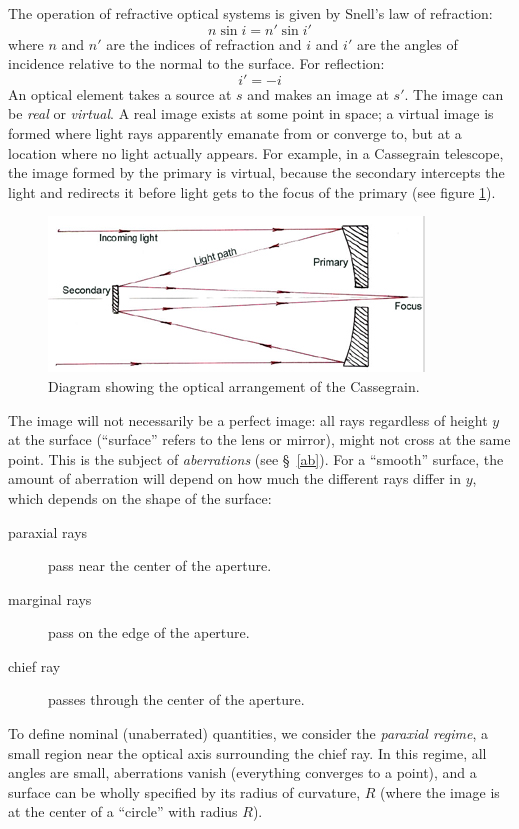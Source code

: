 \documentclass[12pt]{article}
\begin{document}
The operation of refractive optical systems is given by Snell's law
of refraction:
\[
    n\sin{i} = n'\sin{i'}
    \]
where $n$ and $n'$ are the indices of refraction and $i$ and $i'$ are the
angles of incidence relative to the normal to the surface. For
reflection:
\[
    i' = -i
    \]
An optical element takes a source at $s$ and makes an image at $s'$. The image
can be \textit{real} or \textit{virtual}. A real image exists at some point in
space; a virtual image is formed where light rays apparently emanate from or
converge to, but at a location where no light actually appears. For example, in
a Cassegrain telescope, the image formed by the primary is virtual, because the
secondary intercepts the light and redirects it before light gets to the focus
of the primary (see figure {\ref{cassegrain}}).
\begin{figure}[h]
    \centering
    \includegraphics{cassegrain.png}
    \caption{Diagram showing the optical arrangement of the Cassegrain.}
    \label{cassegrain}
\end{figure}
The image will not necessarily be a perfect image: all rays regardless of
height $y$ at the surface (``surface'' refers to the lens or mirror), might not
cross at the same point. This is the subject of \textit{aberrations} (see
\S{}~{\ref{ab}}). For a ``smooth'' surface, the amount of aberration will
depend on how much the different rays differ in $y$, which depends on the shape
of the surface:
\begin{description}
    \item [paraxial rays] pass near the center of the aperture.
    \item [marginal rays] pass on the edge of the aperture.
    \item [chief ray] passes through the center of the aperture.
\end{description}
To define nominal (unaberrated) quantities, we consider the \textit{paraxial
regime}, a small region near the optical axis surrounding the chief ray. In
this regime, all angles are small, aberrations vanish (everything converges to
a point), and a surface can be wholly specified by its radius of curvature, $R$
(where the image is at the center of a ``circle'' with radius $R$).
\end{document}
